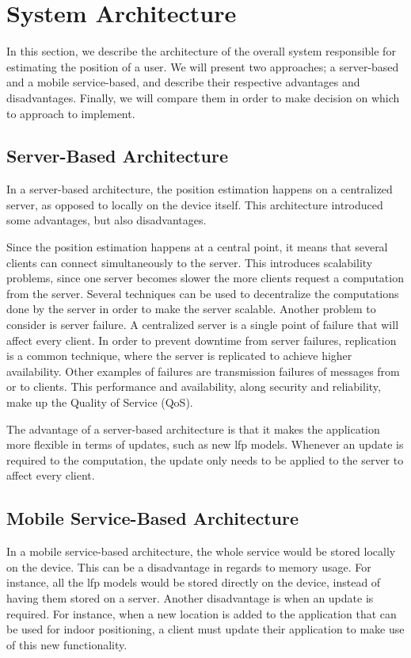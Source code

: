 \section{System Architecture}
In this section, we describe the architecture of the overall system responsible for estimating the position of a user. We will present two approaches; a server-based and a mobile service-based, and describe their respective advantages and disadvantages. Finally, we will compare them in order to make decision on which to approach to implement.

\subsection{Server-Based Architecture}
In a server-based architecture, the position estimation happens on a centralized server, as opposed to locally on the device itself. This architecture introduced some advantages, but also disadvantages.

Since the position estimation happens at a central point, it means that several clients can connect simultaneously to the server. This introduces scalability problems, since one server becomes slower the more clients request a computation from the server. Several techniques can be used to decentralize the computations done by the server in order to make the server scalable. Another problem to consider is server failure. A centralized server is a single point of failure that will affect every client. In order to prevent downtime from server failures, replication is a common technique, where the server is replicated to achieve higher availability. Other examples of failures are transmission failures of messages from or to clients.
This performance and availability, along security and reliability, make up the Quality of Service (QoS).\cite{DS}

The advantage of a server-based architecture is that it makes the application more flexible in terms of updates, such as new \gls{lfp} models. Whenever an update is required to the computation, the update only needs to be applied to the server to affect every client.

\subsection{Mobile Service-Based Architecture}
In a mobile service-based architecture, the whole service would be stored locally on the device. This can be a disadvantage in regards to memory usage. For instance, all the \gls{lfp} models would be stored directly on the device, instead of having them stored on a server. Another disadvantage is when an update is required. For instance, when a new location is added to the application that can be used for indoor positioning, a client must update their application to make use of this new functionality.

